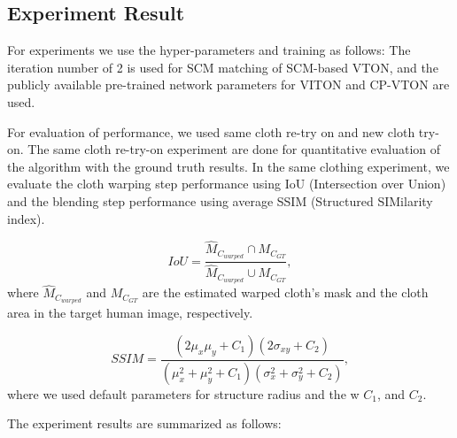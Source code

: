 \subsection{Experiment Result} 

For experiments we use the hyper-parameters and training as follows: The iteration number of 2 is used for SCM matching of SCM-based VTON, and the publicly available pre-trained network parameters for VITON and CP-VTON are used.

For evaluation of performance, we used same cloth re-try on and new cloth try-on. 
The same cloth re-try-on experiment are done for quantitative evaluation of the algorithm with the ground truth results. In the same clothing experiment, we evaluate the cloth warping step performance using IoU (Intersection over Union) and the blending step performance using average SSIM (Structured SIMilarity index).

\begin{equation}
 IoU = \frac{ \hat{M}_{C_{warped}} \cap M_{C_{GT}}}
            { \hat{M}_{C_{warped}} \cup M_{C_{GT}}},
\end{equation} 
where $\hat{M}_{C_{warped}}$ and $M_{C_{GT}}$ are the estimated warped cloth's mask and the cloth area in the target human image, respectively. 

\begin{equation}
 SSIM = \frac{ ( 2 \mu_x \mu_y + C_1 )(2 \sigma_{xy} + C_2) }
             { ( \mu^2_x + \mu^2_y +C_1) ( \sigma^2_x + \sigma^2_y + C_2)}, 
\end{equation}
where we used default parameters for structure radius and the w $C_1$, and $C_2$. 

The experiment results are summarized as follows:

